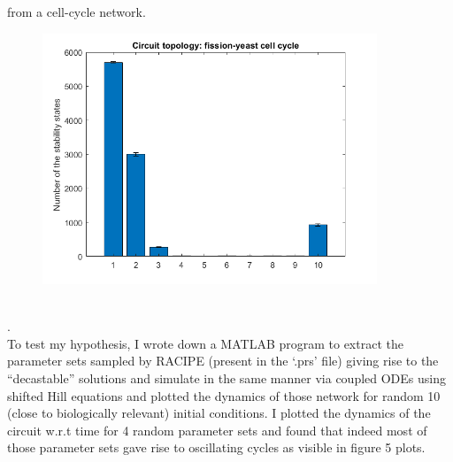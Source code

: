 \documentclass{article}
\begin{document}
from a cell-cycle network.
\begin{figure}[H]
  \centering
  \includegraphics[width=100mm, scale=0.5]{stability_states.png} \\
   \\
\end{figure}
.\\

To test my hypothesis, I wrote down a MATLAB program to extract the parameter 
sets sampled by RACIPE (present in the `.prs' file) giving rise to the 
``decastable'' solutions and simulate in the same manner via coupled ODEs 
using shifted Hill equations and plotted the dynamics of those network for 
random 10 (close to biologically relevant) initial conditions. I plotted 
the dynamics of the circuit w.r.t time for 4 random parameter sets and found that 
indeed most of those parameter sets gave rise to oscillating cycles as visible 
in figure 5 plots.  
\end{document}
